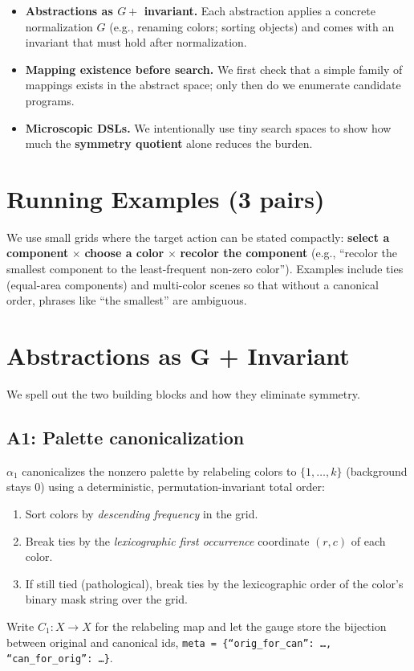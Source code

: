 \documentclass[11pt]{article}
\newcommand{\code}[1]{\texttt{#1}}
\begin{document}
\begin{itemize}
\item \textbf{Abstractions as $G +$ invariant.} Each abstraction applies a concrete normalization $G$ (e.g., renaming colors; sorting objects) and comes with an invariant that must hold after normalization.
\item \textbf{Mapping existence before search.} We first check that a simple family of mappings exists in the abstract space; only then do we enumerate candidate programs.
\item \textbf{Microscopic DSLs.} We intentionally use tiny search spaces to show how much the \textbf{symmetry quotient} alone reduces the burden.
\end{itemize}

\section{Running Examples (3 pairs)}

We use small grids where the target action can be stated compactly: \textbf{select a component} $\times$ \textbf{choose a color} $\times$ \textbf{recolor the component} (e.g., ``recolor the smallest component to the least-frequent non-zero color''). Examples include ties (equal-area components) and multi-color scenes so that without a canonical order, phrases like ``the smallest'' are ambiguous.

\section{Abstractions as G + Invariant}

We spell out the two building blocks and how they eliminate symmetry.


\subsection{A1: Palette canonicalization}

$\alpha_1$ canonicalizes the nonzero palette by relabeling colors to $\{1,\dots,k\}$ (background stays $0$) using a deterministic, permutation-invariant total order:
\begin{enumerate}
\item Sort colors by \emph{descending frequency} in the grid.
\item Break ties by the \emph{lexicographic first occurrence} coordinate $(r,c)$ of each color.
\item If still tied (pathological), break ties by the lexicographic order of the color's binary mask string over the grid.
\end{enumerate}
Write $C_1:X\to X$ for the relabeling map and let the gauge store the bijection between original and canonical ids, \code{meta = \{``orig\_for\_can'': \dots, ``can\_for\_orig'': \dots\}}.
\end{document}
